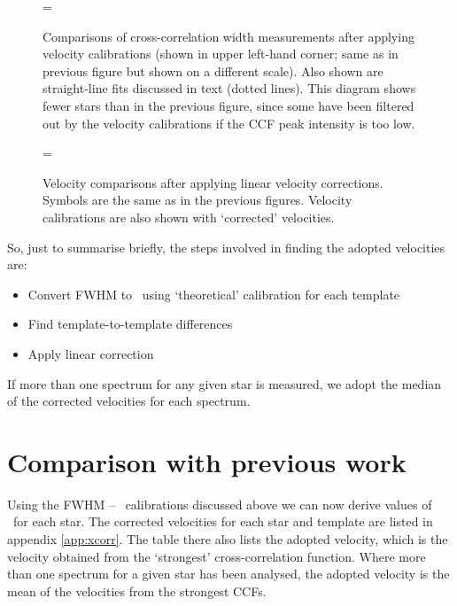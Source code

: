 \begin{figure} %
\epsfxsize=\figwidth
\setlength{\cen}{(\textwidth / 2) - (\epsfxsize / 2)}
\hspace{\cen}
\caption[\vsini\ comparisons for different templates]
{\fcfont Comparisons of cross-correlation width measurements after
applying velocity calibrations (shown in upper left-hand corner; same
as in previous figure but shown on a different scale). Also shown are
straight-line fits discussed in text (dotted lines). This diagram shows
fewer stars than in the previous figure, since some have been filtered
out by the velocity calibrations if the CCF peak intensity is too low.
}
\label{fig:xcorr:cal}
\end{figure}   %

\begin{figure} %
\epsfxsize=\figwidth
\setlength{\cen}{(\textwidth / 2) - (\epsfxsize / 2)}
\hspace{\cen}
\caption[Velocity corrections]
{\fcfont Velocity comparisons after applying linear velocity
corrections. Symbols are the same as in the previous figures. Velocity
calibrations are also shown with `corrected' velocities.
}
\label{fig:xcorr:cor}
\end{figure}   %

So, just to summarise briefly, the steps involved in finding the
adopted velocities are:
%
\begin{itemize}
\item	Convert FWHM to \vsini\ using `theoretical' calibration for
	each template
\item	Find template-to-template differences
\item	Apply linear correction
\end{itemize}
%
If more than one spectrum for any given star is measured, we adopt the
median of the corrected velocities for each spectrum.

\section{Comparison with previous work}

Using the FWHM -- \vsini\ calibrations discussed above we can now
derive values of \vsini\ for each star. The corrected velocities for
each star and template are listed in appendix \ref{app:xcorr}. The
table there also lists the adopted velocity, which is the velocity
obtained from the `strongest' cross-correlation function. Where more
than one spectrum for a given star has been analysed, the adopted
velocity is the mean of the velocities from the strongest CCFs.

